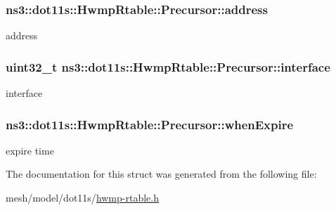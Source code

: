 \subsubsection[{\texorpdfstring{address}{address}}]{ ns3\+::dot11s\+::\+Hwmp\+Rtable\+::\+Precursor\+::address}\hypertarget{structns3_1_1dot11s_1_1HwmpRtable_1_1Precursor_a0ec2e16be8a1a862e6f97b208639bbb5}{}\label{structns3_1_1dot11s_1_1HwmpRtable_1_1Precursor_a0ec2e16be8a1a862e6f97b208639bbb5}


address 

\subsubsection[{\texorpdfstring{interface}{interface}}]{\setlength{\rightskip}{0pt plus 5cm}uint32\+\_\+t ns3\+::dot11s\+::\+Hwmp\+Rtable\+::\+Precursor\+::interface}\hypertarget{structns3_1_1dot11s_1_1HwmpRtable_1_1Precursor_a560f4db1dedcbb331fd1442035d7caba}{}\label{structns3_1_1dot11s_1_1HwmpRtable_1_1Precursor_a560f4db1dedcbb331fd1442035d7caba}


interface 

\subsubsection[{\texorpdfstring{when\+Expire}{whenExpire}}]{ ns3\+::dot11s\+::\+Hwmp\+Rtable\+::\+Precursor\+::when\+Expire}\hypertarget{structns3_1_1dot11s_1_1HwmpRtable_1_1Precursor_a69b4a8e5aac52921a0a41b1e0756848e}{}\label{structns3_1_1dot11s_1_1HwmpRtable_1_1Precursor_a69b4a8e5aac52921a0a41b1e0756848e}


expire time 



The documentation for this struct was generated from the following file\+:\begin{DoxyCompactItemize}
\item 
mesh/model/dot11s/\hyperlink{hwmp-rtable_8h}{hwmp-\/rtable.\+h}\end{DoxyCompactItemize}
